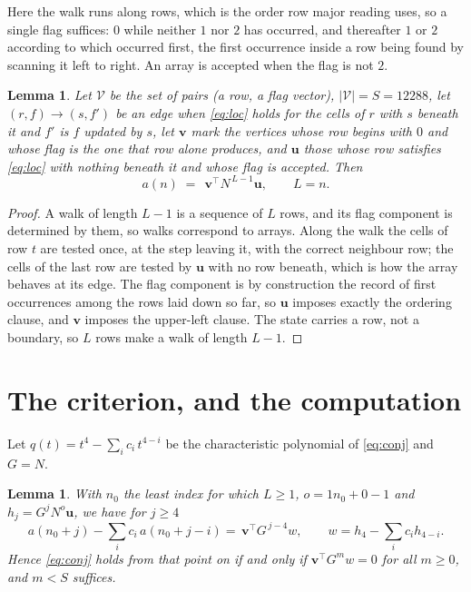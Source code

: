 \documentclass[11pt,a4paper]{article}
\theoremstyle{plain}
\newtheorem{lemma}[theorem]{Lemma}
\theoremstyle{definition}
\begin{document}
Here the walk runs along rows, which is the order row
major reading uses, so a single flag suffices: $0$ while neither $1$ nor $2$ has
occurred, and thereafter $1$ or $2$ according to which occurred first, the first occurrence
inside a row being found by scanning it left to right. An array is accepted when the flag
is not $2$.

\begin{lemma}\label{lem:walk}
Let $\mathcal V$ be the set of pairs (a row, a flag vector), $|\mathcal V|=S=12288$, let
$(r,f)\to(s,f')$ be an edge when \eqref{eq:loc} holds for the cells of $r$ with $s$ beneath
it and $f'$ is $f$ updated by $s$, let $\mathbf{v}$ mark the vertices whose row begins
with $0$ and whose flag is the one that row alone produces, and $\mathbf{u}$ those whose
row satisfies \eqref{eq:loc} with nothing beneath it and whose flag is accepted. Then
\[
a(n)\;=\;\,\mathbf{v}^{\!\top}N^{\,L-1}\mathbf{u},\qquad L=n.
\]
\end{lemma}

\begin{proof}
A walk of length $L-1$ is a sequence of $L$ rows, and its flag component is determined by
them, so walks correspond to arrays. Along the walk the cells of row $t$ are tested once,
at the step leaving it, with the correct neighbour row; the cells of the last row are
tested by $\mathbf{u}$ with no row beneath, which is how the array behaves at its edge.
The flag component is by construction the record of first occurrences among the rows laid
down so far, so $\mathbf{u}$ imposes exactly the ordering clause, and $\mathbf{v}$ imposes
the upper-left clause. The state carries a row, not a boundary, so $L$ rows make a walk
of length $L-1$.
\end{proof}

\section{The criterion, and the computation}

Let $q(t)=t^{4}-\sum_i c_i\,t^{4-i}$ be the characteristic polynomial of
\eqref{eq:conj} and $G=N$.

\begin{lemma}\label{lem:crit}
With $n_0$ the least index for which $L\ge1$, $o=1n_0+0-1$ and
$h_j=G^{j}N^{o}\mathbf{u}$, we have for $j\ge4$
\[
a(n_0+j)-\sum_i c_i\,a(n_0+j-i)=\,\mathbf{v}^{\!\top}G^{\,j-4}w,
\qquad w=h_{4}-\sum_i c_ih_{4-i} .
\]
Hence \eqref{eq:conj} holds from that point on if and only if
$\mathbf{v}^{\!\top}G^{m}w=0$ for all $m\ge0$, and $m<S$ suffices.
\end{lemma}
\end{document}
